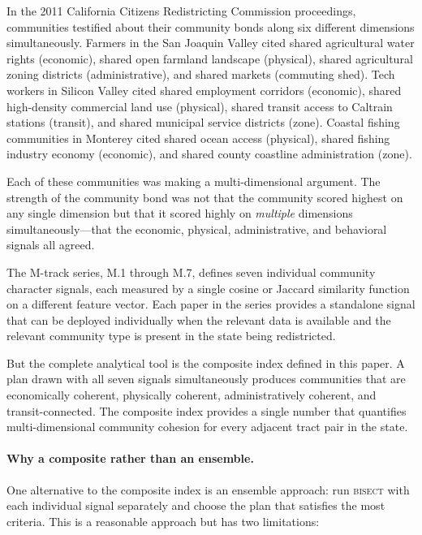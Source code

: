 \label{sec:introduction}

In the 2011 California Citizens Redistricting Commission proceedings,
communities testified about their community bonds along six different
dimensions simultaneously.
Farmers in the San Joaquin Valley cited shared agricultural water rights
(economic), shared open farmland landscape (physical), shared agricultural
zoning districts (administrative), and shared markets (commuting shed).
Tech workers in Silicon Valley cited shared employment corridors (economic),
shared high-density commercial land use (physical), shared transit access
to Caltrain stations (transit), and shared municipal service districts (zone).
Coastal fishing communities in Monterey cited shared ocean access (physical),
shared fishing industry economy (economic), and shared county coastline
administration (zone).

Each of these communities was making a multi-dimensional argument.
The strength of the community bond was not that the community scored highest
on any single dimension but that it scored highly on \emph{multiple} dimensions
simultaneously---that the economic, physical, administrative, and behavioral
signals all agreed.

The M-track series, M.1 through M.7, defines seven individual community
character signals, each measured by a single cosine or Jaccard similarity
function on a different feature vector.
Each paper in the series provides a standalone signal that can be deployed
individually when the relevant data is available and the relevant community
type is present in the state being redistricted.

But the complete analytical tool is the composite index defined in this paper.
A plan drawn with all seven signals simultaneously produces communities that
are economically coherent, physically coherent, administratively coherent,
and transit-connected.
The composite index provides a single number that quantifies multi-dimensional
community cohesion for every adjacent tract pair in the state.

\paragraph{Why a composite rather than an ensemble.}
One alternative to the composite index is an ensemble approach: run
\textsc{bisect} with each individual signal separately and choose the plan
that satisfies the most criteria.
This is a reasonable approach but has two limitations:


